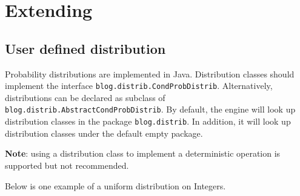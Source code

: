 \documentclass[12pt]{article}
\begin{document}


\section{Extending \bl}
\subsection{User defined distribution}
Probability distributions are implemented in Java.  Distribution classes should implement the interface \verb|blog.distrib.CondProbDistrib|.
Alternatively, distributions can be declared as subclass of \verb|blog.distrib.AbstractCondProbDistrib|. 
By default, the \bl engine will look up distribution classes in the package \verb|blog.distrib|. In addition, it will look up distribution classes under the default empty package. 

{\bf Note}: using a distribution class to implement a deterministic operation is supported but not recommended. 

Below is one example of a uniform distribution on Integers.
\end{document}
